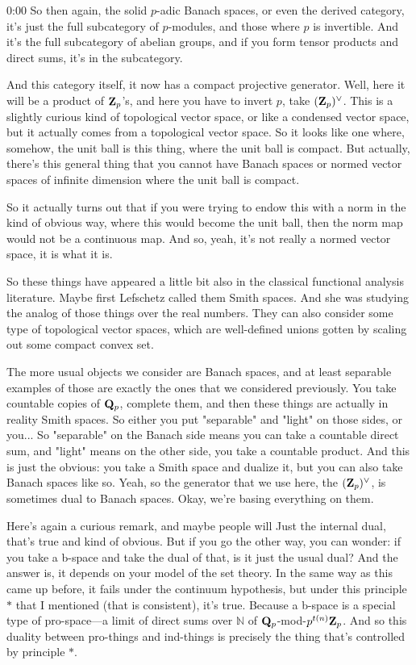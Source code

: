 \begin{unfinished}{0:00}
So then again, the solid $p$-adic Banach spaces, or even the derived category, it's just the full subcategory of $p$-modules, and those where $p$ is invertible. And it's the full subcategory of abelian groups, and if you form tensor products and direct sums, it's in the subcategory.

And this category itself, it now has a compact projective generator. Well, here it will be a product of $\mathbf Z_p$'s, and here you have to invert $p$, take $(\mathbf Z_p)^\vee$. This is a slightly curious kind of topological vector space, or like a condensed vector space, but it actually comes from a topological vector space. So it looks like one where, somehow, the unit ball is this thing, where the unit ball is compact. But actually, there's this general thing that you cannot have Banach spaces or normed vector spaces of infinite dimension where the unit ball is compact.

So it actually turns out that if you were trying to endow this with a norm in the kind of obvious way, where this would become the unit ball, then the norm map would not be a continuous map. And so, yeah, it's not really a normed vector space, it is what it is.

So these things have appeared a little bit also in the classical functional analysis literature. Maybe first Lefschetz called them Smith spaces. And she was studying the analog of those things over the real numbers. They can also consider some type of topological vector spaces, which are well-defined unions gotten by scaling out some compact convex set.

The more usual objects we consider are Banach spaces, and at least separable examples of those are exactly the ones that we considered previously. You take countable copies of $\mathbf Q_p$, complete them, and then these things are actually in reality Smith spaces. So either you put "separable" and "light" on those sides, or you... So "separable" on the Banach side means you can take a countable direct sum, and "light" means on the other side, you take a countable product. And this is just the obvious: you take a Smith space and dualize it, but you can also take Banach spaces like so. Yeah, so the generator that we use here, the $(\mathbf Z_p)^\vee$, is sometimes dual to Banach spaces. Okay, we're basing everything on them.

Here's again a curious remark, and maybe people will
Just the internal dual, that's true and kind of obvious. But if you go the other way, you can wonder: if you take a b-space and take the dual of that, is it just the usual dual? And the answer is, it depends on your model of the set theory. In the same way as this came up before, it fails under the continuum hypothesis, but under this principle $*$ that I mentioned (that is consistent), it's true. Because a b-space is a special type of pro-space---a limit of direct sums over $\mathbb{N}$ of $\mathbf Q_p$-mod-$p^{t(n)} \mathbf Z_p$. And so this duality between pro-things and ind-things is precisely the thing that's controlled by principle $*$.


\end{unfinished}
